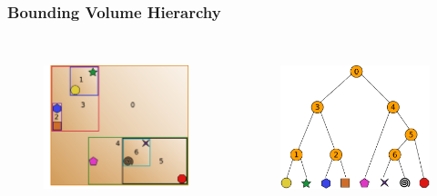 \documentclass{beamer}
\begin{document}
\begin{frame}
  \frametitle{Bounding Volume Hierarchy}
  
\begin{columns}[t]

\begin{figure}
\includegraphics[height=45mm]{build4.png}
\end{figure}

\begin{figure}
\includegraphics[height=45mm]{primitive_tree_narrow.png}
\end{figure}
\end{columns}
\end{frame}
\end{document}
